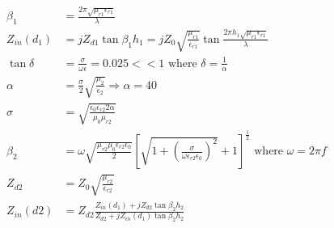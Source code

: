             \begin{subequations}
                \label{eq:Zin}
                \begin{align}
                    \beta_1 & = \frac{2\pi\sqrt{\mu_{r1}\epsilon_{r1}}}{\lambda} \label{eq:beta_1} \\
                    Z_{in}(d_1) & = jZ_{d1}\tan{\beta_1h_1} = jZ_0\sqrt{\frac{\mu_{r1}}{\epsilon_{r1}}}
                            \tan{\frac{2\pi h_1\sqrt{\mu_{r1}\epsilon_{r1}}}{\lambda}} \label{eq:Zin_d1} \\
                    \tan{\delta} & = \frac{\sigma}{\omega\epsilon} = 0.025 << 1
                        \textrm{ where } \delta = \frac{1}{\alpha} \label{eq:lossTangent} \\
                    \alpha & = \frac{\sigma}{2}\sqrt{\frac{\mu_2}{\epsilon_2}} \Rightarrow \alpha = 40 \label{eq:alpha} \\
                    \sigma & = \sqrt{\frac{\epsilon_0\epsilon_{r2}2\alpha}{\mu_0\mu_{r2}}} \label{eq:sigma} \\
                    \beta_2 & = \omega\sqrt{\frac{\mu_{r2}\mu_0\epsilon_{r2}\epsilon_0}{2}}
                        \left[
                            \sqrt{1+\left(\frac{\sigma}{\omega\epsilon_{r2}\epsilon_0}\right)^2}+1
                        \right]^\frac{1}{2} \textrm{ where } \omega = 2\pi f \label{eq:beta_2} \\
                    Z_{d2} & = Z_0\sqrt{\frac{\mu_{r2}}{\epsilon_{r2}}} \label{eq:Zd2} \\
                    Z_{in}(d2) & = Z_{d2}\frac{Z_{in}(d_1)+jZ_{d2}\tan{\beta_2h_2}}
                        {Z_{d2}+jZ_{in}(d_1)\tan{\beta_2h_2}} \label{eq:Zin_d2}
                \end{align} 
            \end{subequations}
            
